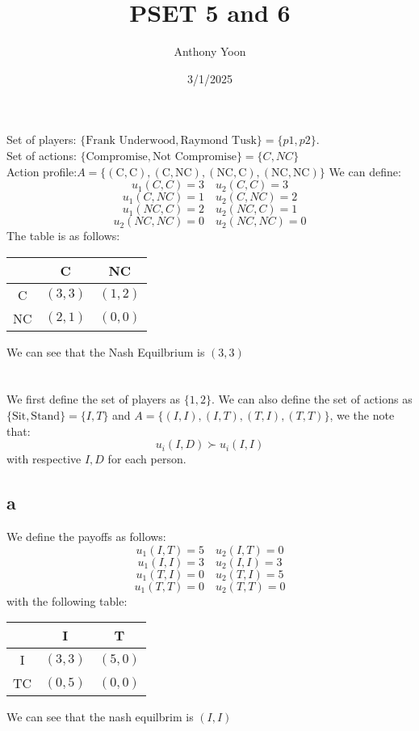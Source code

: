 \documentclass[11pt]{article}
\title{PSET 5 and 6}
\author{Anthony Yoon}
\date{3/1/2025}
\begin{document}
\maketitle
\section{}
Set of players: $\{ \text{Frank Underwood}, \text{Raymond Tusk}\} = \{p1, p2\}$.\\ 
Set of actions: $\{\text{Compromise}, \text{Not Compromise}\} = \{ C, NC\}$ \\
Action profile:$A = \{ (\text{C}, \text{C}),(\text{C}, \text{NC}), (\text{NC}, \text{C}), (\text{NC}, \text{NC})\}$
We can define:
\[
u_1(C, C) = 3 \quad u_2(C,C) = 3 
\]
\[
u_1(C, NC) = 1 \quad u_2(C, NC) = 2
\]
\[
u_1(NC, C) = 2 \quad u_2(NC, C) = 1
\]
\[
u_2(NC, NC) = 0 \quad u_2(NC, NC) = 0
\]
The table is as follows:
\begin{table}[H]
    \centering 
    \begin{tabular}{c|c|c}
        & C & NC\\
        \hline
        C & $(3,3)$ & $(1,2)$\\
        NC & $(2,1)$ & $(0,0)$ 
    \end{tabular}
\end{table}
\noindent We can see that the Nash Equilbrium is $(3,3)$
\newpage
\section{}
We first define the set of players as $\{1,2\}$. We can also define the set of actions as $\{ \text{Sit}, \text{Stand} \} =\{I, T\}$ and $A = \{ (I, I), (I, T), (T, I), (T,T)\}$, we the note that:
\[
u_i(I, D) \succ u_i(I, I)
\] 
with respective $I, D$ for each person. 
\subsection*{a}
We define the payoffs as follows:
\[
u_1(I, T) = 5 \quad u_2(I,T) = 0
\]
\[
u_1(I, I) = 3 \quad u_2(I, I) = 3
\]
\[
u_1(T, I) = 0 \quad u_2(T, I) = 5
\]
\[
u_1(T, T) = 0 \quad u_2(T,T) = 0
\]
with the following table:
\begin{table}[H]
    \centering 
    \begin{tabular}{c|c|c}
        & I & T\\
        \hline
        I & $(3,3)$ & $(5,0)$\\
        TC & $(0,5)$ & $(0,0)$ 
    \end{tabular}
\end{table}
\noindent We can see that the nash equilbrim is $(I,I)$
\end{document}
